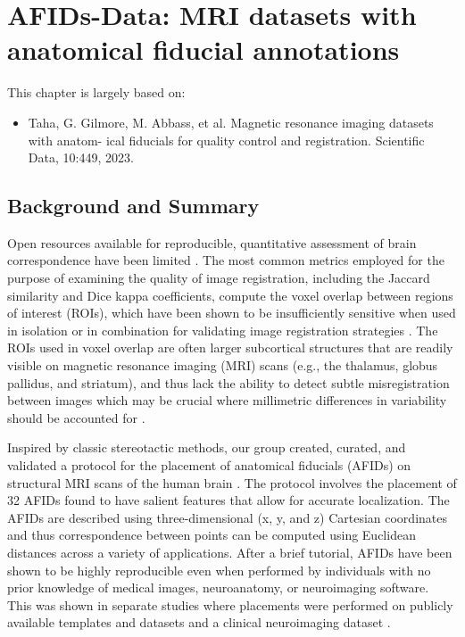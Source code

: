 \chapter{AFIDs-Data: MRI datasets with anatomical fiducial annotations}\label{chap:afidsdata}
\newpage
\sloppy
\noindent This chapter is largely based on:
\begin{itemize}[noitemsep,topsep=0pt]
	\item Taha, G. Gilmore, M. Abbass, et al. Magnetic resonance imaging datasets with anatom-
ical fiducials for quality control and registration. Scientific Data, 10:449, 2023.
\end{itemize}
\section{Background and Summary}
Open resources available for reproducible, quantitative assessment of brain correspondence have been limited \cite{Rohlfing2012-kt}. The most common metrics employed for the purpose of examining the quality of image registration, including the Jaccard similarity and Dice kappa coefficients, compute the voxel overlap between regions of interest (ROIs), which have been shown to be insufficiently sensitive when used in isolation or in combination for validating image registration strategies \cite{Rohlfing2012-kt}. The ROIs used in voxel overlap are often larger subcortical structures that are readily visible on magnetic resonance imaging (MRI) scans (e.g., the thalamus, globus pallidus, and striatum), and thus lack the ability to detect subtle misregistration between images which may be crucial where millimetric differences in variability should be accounted for \cite{Rohlfing2012-kt,Lau2019-eh,Abbass2022-lf,Chakravarty2009-kq}.

Inspired by classic stereotactic methods, our group created, curated, and validated a protocol for the placement of anatomical fiducials (AFIDs) on structural MRI scans of the human brain \cite{Lau2019-eh}. The protocol involves the placement of 32 AFIDs found to have salient features that allow for accurate localization. The AFIDs are described using three-dimensional (x, y, and z) Cartesian coordinates and thus correspondence between points can be computed using Euclidean distances across a variety of applications. After a brief tutorial, AFIDs have been shown to be highly reproducible even when performed by individuals with no prior knowledge of medical images, neuroanatomy, or neuroimaging software. This was shown in separate studies where placements were performed on publicly available templates and datasets \cite{Lau2019-eh} and a clinical neuroimaging dataset \cite{Abbass2022-lf}.

